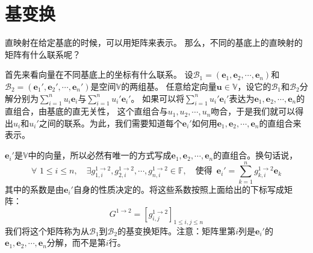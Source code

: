 \documentclass[12pt,UTF8]{ctexbook}
\begin{document}
\section{基变换}
直映射在给定基底的时候，可以用矩阵来表示。
那么，不同的基底上的直映射的矩阵有什么联系呢？

首先来看向量在不同基底上的坐标有什么联系。
设$\mathcal{B}_1 = (\mathbf{e}_1, \mathbf{e}_2, \cdots, \mathbf{e}_n)$和$\mathcal{B}_2= (\mathbf{e}_1', \mathbf{e}_2', \cdots, \mathbf{e}_n')$是空间$\mathbb{V}$的两组基。
任意给定向量$\mathbf{u} \in \mathbb{V}$，设它的$\mathcal{B}_1$和$\mathcal{B}_2$分解分别为$\sum_{i=1}^n u_i\mathbf{e}_i $与$\sum_{i=1}^n u_i'\mathbf{e}_i' $。
如果可以将$\sum_{i=1}^n u_i'\mathbf{e}_i' $表达为$\mathbf{e}_1, \mathbf{e}_2, \cdots, \mathbf{e}_n$的直组合，由基底的直无关性，
这个直组合与$u_1, u_2, \cdots, u_n$吻合，于是我们就可以得出$u_i$和$u_i'$之间的联系。为此，我们需要知道每个$\mathbf{e}_i'$如何用$\mathbf{e}_1, \mathbf{e}_2, \cdots, \mathbf{e}_n$的直组合来表示。

$\mathbf{e}_i'$是$\mathbb{V}$中的向量，所以必然有唯一的方式写成$\mathbf{e}_1, \mathbf{e}_2, \cdots, \mathbf{e}_n$的直组合。换句话说，
$$ \forall \,\, 1 \leqslant i \leqslant n, \quad \exists g_{1, i}^{1\rightarrow 2}, g_{2, i}^{1\rightarrow 2} ,\cdots , g_{n, i}^{1\rightarrow 2} \in \mathbb{F}, \quad \mbox{使得} \,\,\, \mathbf{e}_i' = \sum_{k=1}^n g_{k,i}^{1\rightarrow 2} \mathbf{e}_k$$
其中的系数是由$\mathbf{e}_i'$自身的性质决定的。将这些系数按照上面给出的下标写成矩阵：
$$G^{1\rightarrow 2} = \left[g_{i,j}^{1\rightarrow 2}\right]_{1\leqslant i , j \leqslant n}$$
我们将这个矩阵称为从$\mathcal{B}_1$到$\mathcal{B}_2$的基变换矩阵。注意：矩阵里第$i$列是$\mathbf{e}_i'$的$\mathbf{e}_1, \mathbf{e}_2, \cdots, \mathbf{e}_n$分解，而不是第$i$行。
\end{document}
